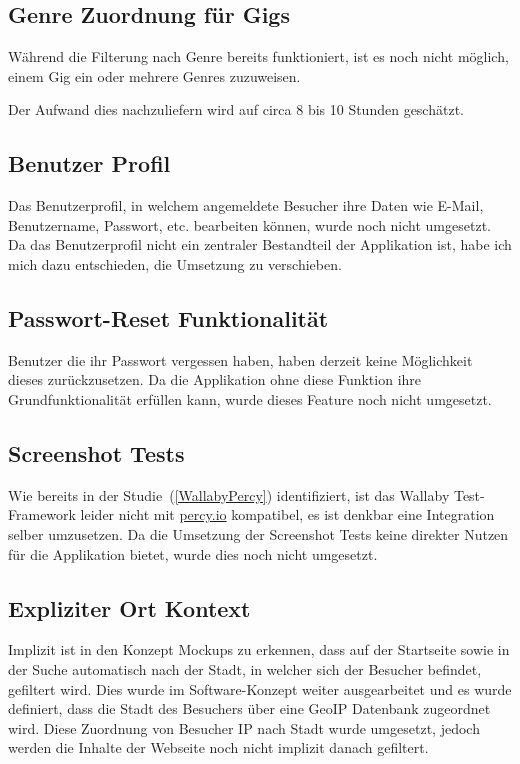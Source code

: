 \subsection{Genre Zuordnung für Gigs}

Während die Filterung nach Genre bereits funktioniert, ist es noch nicht
möglich, einem Gig ein oder mehrere Genres zuzuweisen.

Der Aufwand dies nachzuliefern wird auf circa 8 bis 10 Stunden geschätzt.

\subsection{Benutzer Profil}

Das Benutzerprofil, in welchem angemeldete Besucher ihre Daten wie E-Mail,
Benutzername, Passwort, etc. bearbeiten können, wurde noch nicht umgesetzt.
Da das Benutzerprofil nicht ein zentraler Bestandteil der Applikation ist,
habe ich mich dazu entschieden, die Umsetzung zu verschieben.

\subsection{Passwort-Reset Funktionalität}

Benutzer die ihr Passwort vergessen haben, haben derzeit keine Möglichkeit
dieses zurückzusetzen. Da die Applikation ohne diese Funktion ihre
Grundfunktionalität erfüllen kann, wurde dieses Feature noch nicht umgesetzt.

\subsection{Screenshot Tests}

Wie bereits in der Studie~(\ref{WallabyPercy}) identifiziert, ist das
Wallaby Test-Framework leider nicht mit \href{https://percy.io/}{percy.io}
kompatibel, es ist denkbar eine Integration selber umzusetzen. Da die
Umsetzung der Screenshot Tests keine direkter Nutzen für die Applikation
bietet, wurde dies noch nicht umgesetzt.

\subsection{Expliziter Ort Kontext}

Implizit ist in den Konzept Mockups zu erkennen, dass auf der Startseite sowie
in der Suche automatisch nach der Stadt, in welcher sich der Besucher befindet,
gefiltert wird. Dies wurde im Software-Konzept weiter ausgearbeitet und es wurde
definiert, dass die Stadt des Besuchers über eine GeoIP Datenbank zugeordnet wird.
Diese Zuordnung von Besucher IP nach Stadt wurde umgesetzt, jedoch werden die
Inhalte der Webseite noch nicht implizit danach gefiltert.

